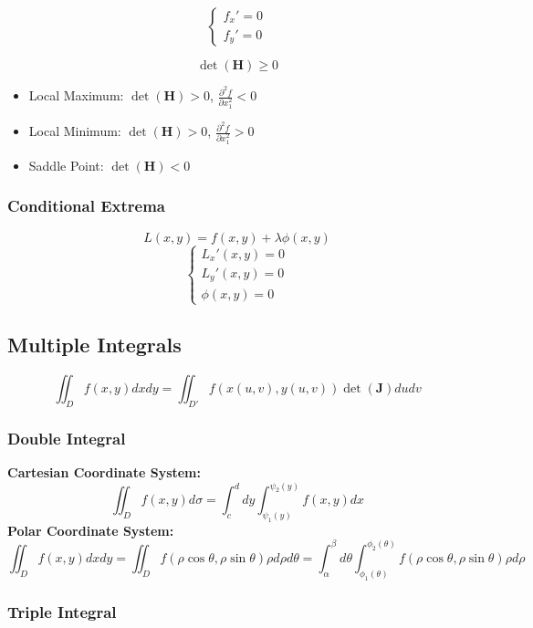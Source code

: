 \documentclass{article}
\begin{document}
\[
    \begin{cases}
        f_x' = 0 \\
        f_y' = 0
    \end{cases}
\]

\[
    \det(\mathbf{H}) \geq 0
\]

\begin{itemize}
    \item Local Maximum: $\det(\mathbf{H}) > 0$, $\frac{\partial^2 f}{\partial x_1^2} < 0$
    \item Local Minimum: $\det(\mathbf{H}) > 0$, $\frac{\partial^2 f}{\partial x_1^2} > 0$
    \item Saddle Point: $\det(\mathbf{H}) < 0$
\end{itemize}

\subsubsection{Conditional Extrema}

\[
    L(x, y) = f(x, y) + \lambda \phi(x, y)
\]
\[
    \begin{cases}
        L_x'(x, y) = 0 \\
        L_y'(x, y) = 0 \\
        \phi(x, y) = 0
    \end{cases}
\]

\subsection{Multiple Integrals}

\[
    \iint_D f(x, y) dx dy = \iint_{D'} f(x(u, v), y(u, v)) \det(\mathbf{J}) du dv
\]

\subsubsection{Double Integral}

\textbf{Cartesian Coordinate System:}
\[
    \iint_D f(x, y) d\sigma = \int_c^d dy \int_{\psi_1(y)}^{\psi_2(y)} f(x, y) dx
\]
\textbf{Polar Coordinate System:}
\[
    \iint_D f(x, y) dx dy = \iint_D f(\rho \cos \theta, \rho \sin \theta) \rho d\rho d\theta = \int_\alpha^\beta d\theta \int_{\phi_1(\theta)}^{\phi_2(\theta)} f(\rho \cos \theta, \rho \sin \theta) \rho d\rho
\]

\subsubsection{Triple Integral}
\end{document}
